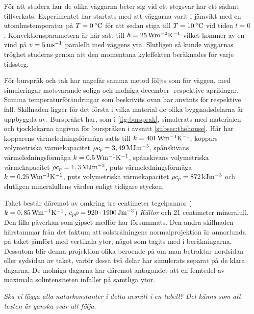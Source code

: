 För att studera hur de olika väggarna beter sig vid ett stegsvar har ett sådant tillverkats. Experimentet
har startats med att väggarna varit i jämvikt med en utomhustemperatur på $T = \unit[0]{^\circ C}$ för att
sedan stiga till $T = \unit[10]{^\circ C}$ vid tiden $t=0$. Konvektionsparametern är här satt till
$h = \unit[25]{W m^{-2}K^{-1}}$ vilket kommer av en vind på
$v = \unit[5]{ms^{-1}}$ paralellt med väggens yta. Slutligen så kunde väggarnas
tröghet studeras genom att den momentana kyleffekten beräknades för varje tidssteg. 

För burspråk och tak har ungefär samma metod följts som för väggen, med simuleringar motsvarande soliga och
molniga december- respektive aprildagar. Samma temperaturförändringar som beskrivits ovan har använts för
respektive fall. Skillnaden ligger för det första i vilka material de olika byggnadsdelarna är uppbyggda av.
Burspråket har, som i \ref{fig:bursprak}, simulerats med materialen och tjocklekarna angivna för burspråken i avsnitt \ref{subsec:thehouse}.
Här har kopparens värmeledningsförmåga satts till $k=\unit[401]{Wm^{-1}K^{-1}}$, koppars volymetriska värmekapacitet
$\rho c_p = \unit[3,49]{MJm^{-3}}$, spånskivans värmeledningsförmåga $k = \unit[0.5]{Wm^{-1}K^{-1}}$, spånskivans volymetriska
värmekapacitet $\rho c_p = \unit[1,3]{MJm^{-3}}$, puts värmeledningsförmåga $k = \unit[0.25]{Wm^{-1}K^{-1}}$, puts volymetriska
värmekapacitet $\rho c_p = \unit[872]{kJm^{-3}}$ och slutligen mineralullens värden
enligt tidigare stycken.
\cite{engineeringcom}\cite{kandidatarbete2010}\cite{engineeringtoolboxthermalconductivity}\cite{engineeringtoolboxspecificheat}

Taket består
däremot av omkring tre centimeter tegelpannor ($k = \unit[0,85]{Wm^{-1}K^{-1}}$, $c_p\rho = \unit[920\cdot 1900]{Jm^{-3}}$)
\emph{\color{red} Källor} och 21 centimeter mineralull. Den lilla påverkan som gipset medför har försummats. Den andra skillnaden härstammar från det faktum att solstrålningens normalprojektion är annorlunda på taket jämfört med vertikala ytor, något som tagits med i beräkningarna. Dessutom blir denna projektion olika beroende på om man betraktar nordsidan eller sydsidan av taket, varför dessa två delar har simulerats separat på de klara dagarna. De molniga dagarna har däremot antagandet att en femtedel av maximala solintensiteten infaller på samtliga ytor.



\emph{\color{red} Ska vi lägga alla naturkonstanter i detta avsnitt i en tabell? Det känns som att texten är ganska svår att följa.}
